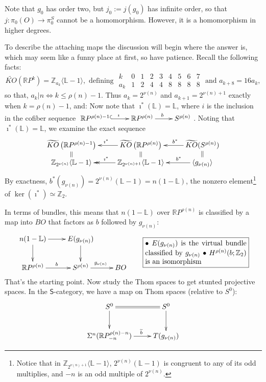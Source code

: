 \documentclass{article}
\newcommand{\Bullet}{\ensuremath{\bullet} }
\newcommand{\Z}{\mathbb{Z}}
\newcommand{\R}{\mathbb{R}}
\newcommand{\RP}{\R P}
\newcommand{\bundle}[1]{\mathbb{#1}}
\newcommand{\CatOf}[1]{\mathsf{#1}}
\newcommand{\Suspend}{\Sigma}
\renewcommand{\to}{\longrightarrow}
\theoremstyle{definition}
\begin{document}
Note that $g_0$ has order two, but $j_0:=j(g_0)$ has infinite order, so that $j:\pi_0(O)\to\pi^S_0$ cannot be a homomorphism. However, it is a homomorphism in higher degrees.

To describe the attaching maps the discussion will begin where the answer is, which may seem like a funny place at first, so have patience.  Recall the following facts:
\[\widetilde{KO}(\RP^k)=\Z_{a_k}\langle \bundle L-1\rangle,\text{ defining }\begin{array}{c|cccccccc}
k&0&1&2&3&4&5&6&7\\\hline
a_k&1&2&4&4&8&8&8&8
\end{array}\text{ and }a_{k+8}=16a_k,\]
so that, $a_k|n\iff k\leq\rho(n)-1$. Thus $a_k=2^{\nu(n)}$ and $a_{k+1}=2^{\nu(n)+1}$ exactly when $k=\rho(n)-1$, and:
Now note that $\imath^*(\bundle L)=\bundle L$, where $i$ is the inclusion in the cofiber sequence
$\xymatrix{
\RP^{\rho(n) - 1} \ar@{^{(}->}[r]^\imath& \RP^{\rho(n)} \ar[r]^b& S^{\rho(n)}
}$.
Noting that $\imath^*(\bundle L)=\bundle L$,
we examine the exact sequence
\[\xymatrix@R=.2cm{
\widetilde{KO} \left( \RP^{\rho(n) - 1} \right)&\ar[l]_{\imath^*}\widetilde{KO} \left( \RP^{\rho(n)} \right)&\ar[l]_{\ \ \ b^*}\widetilde{KO} (S^{\rho(n)})\\
\Z_{2^{\nu(n)}} \langle \bundle L - 1 \rangle\ar@{=}[u]&\ar@{->>}[l]_{\imath^*}\Z_{2^{\nu(n) + 1}} \langle \bundle L - 1 \rangle\ar@{=}[u]&\ar[l]_{\qquad b^*}\langle g_{\nu(n)}\rangle\ar@{=}[u]
}\]
By exactness, $b^*(g_{\nu(n)})=2^{\nu(n)}(\bundle L - 1)=n(1-\bundle L)$, the nonzero element\footnote{Notice that in $\Z_{2^{\nu(n) + 1}} \langle \bundle L - 1\rangle$, $2^{\nu(n)}(\bundle L - 1)$ is congruent to any of its odd multiplies, and $-n$ is an odd multiple of $2^{\nu(n)}$.} of $\ker(\imath^*)\simeq\Z_2$.

  In terms of bundles, this means that $n(1-\bundle L)$ over $\RP^{\rho(n)}$ is classified by a map into $BO$ that factors as $b$ followed by $g_{\nu(n)}$:
\[\xymatrix{
\ar[d]n(1-\bundle L) \ar[r] & E(g_{\nu(n)})\ar[d] \\
\RP^{\rho(n)}\ar[r]^b & S^{\rho(n)} \ar[r]^{g_{\nu(n)}} & BO
}\qquad\fbox{\raisebox{-.65cm}{\begin{minipage}{5cm}
\Bullet $E(g_{\nu(n)})$ is the virtual bundle classified by $g_{\nu(n)}$

\Bullet $H^{\rho(n)}(b;\Z_2)$ is an isomorphism
\end{minipage}}}\]
That's the starting point.  Now study the Thom spaces to get stunted projective spaces.  In the $\CatOf{S}$-category, we have a map on Thom spaces (relative to $S^0$):
\[\xymatrix{S^0\ar[d]\ar@{=}[r]&S^0\ar[d]\\
\Suspend^n(\RP^{\rho(n)-n}_{-n}) \ar[r]^{\ \ \ \widetilde b}& T(g_{\nu(n)})
}\]
\end{document}
